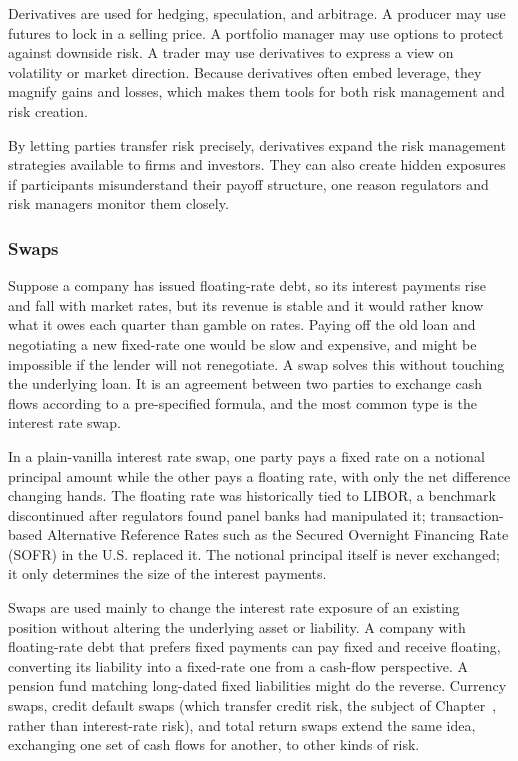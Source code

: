 \documentclass[../ai_in_finance]{subfiles}
\begin{document}
Derivatives are used for hedging, speculation, and arbitrage. A producer may use futures to lock in a selling price. A portfolio manager may use options to protect against downside risk. A trader may use derivatives to express a view on volatility or market direction. Because derivatives often embed leverage, they magnify gains and losses, which makes them tools for both risk management and risk creation.

By letting parties transfer risk precisely, derivatives expand the risk management strategies available to firms and investors. They can also create hidden exposures if participants misunderstand their payoff structure, one reason regulators and risk managers monitor them closely.

\subsubsection*{Swaps}

Suppose a company has issued floating-rate debt, so its interest payments rise and fall with market rates, but its revenue is stable and it would rather know what it owes each quarter than gamble on rates. Paying off the old loan and negotiating a new fixed-rate one would be slow and expensive, and might be impossible if the lender will not renegotiate.
A swap solves this without touching the underlying loan. It is an agreement between two parties to exchange cash flows according to a pre-specified formula, and the most common type is the interest rate swap.

In a plain-vanilla interest rate swap, one party pays a fixed rate on a notional principal amount while the other pays a floating rate, with only the net difference changing hands. The floating rate was historically tied to LIBOR, a benchmark discontinued after regulators found panel banks had manipulated it; transaction-based Alternative Reference Rates such as the Secured Overnight Financing Rate (SOFR) in the U.S. replaced it. The notional principal itself is never exchanged; it only determines the size of the interest payments.

Swaps are used mainly to change the interest rate exposure of an existing position without altering the underlying asset or liability. A company with floating-rate debt that prefers fixed payments can pay fixed and receive floating, converting its liability into a fixed-rate one from a cash-flow perspective. A pension fund matching long-dated fixed liabilities might do the reverse. Currency swaps, credit default swaps (which transfer credit risk, the subject of Chapter~, rather than interest-rate risk), and total return swaps extend the same idea, exchanging one set of cash flows for another, to other kinds of risk.
\end{document}
